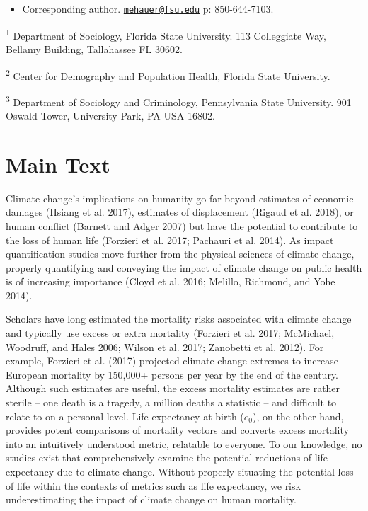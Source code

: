 \documentclass[12pt,]{article}
\providecommand{\tightlist}{%
\setlength{\itemsep}{0pt}\setlength{\parskip}{0pt}}
\begin{document}
\vskip 6.5pt


\noindent \doublespacing \begin{itemize}
\tightlist
\item
  Corresponding author.
  \href{mailto:mehauer@fsu.edu}{\nolinkurl{mehauer@fsu.edu}} p:
  850-644-7103.
\end{itemize}

\textsuperscript{1} Department of Sociology, Florida State University.
113 Colleggiate Way, Bellamy Building, Tallahassee FL 30602.

\textsuperscript{2} Center for Demography and Population Health, Florida
State University.

\textsuperscript{3} Department of Sociology and Criminology,
Pennsylvania State University. 901 Oswald Tower, University Park, PA USA
16802.

\newpage

\hypertarget{main-text}{%
\section{Main Text}\label{main-text}}

Climate change's implications on humanity go far beyond estimates of
economic damages (Hsiang et al. 2017), estimates of displacement (Rigaud
et al. 2018), or human conflict (Barnett and Adger 2007) but have the
potential to contribute to the loss of human life (Forzieri et al. 2017;
Pachauri et al. 2014). As impact quantification studies move further
from the physical sciences of climate change, properly quantifying and
conveying the impact of climate change on public health is of increasing
importance (Cloyd et al. 2016; Melillo, Richmond, and Yohe 2014).

Scholars have long estimated the mortality risks associated with climate
change and typically use excess or extra mortality (Forzieri et al.
2017; McMichael, Woodruff, and Hales 2006; Wilson et al. 2017; Zanobetti
et al. 2012). For example, Forzieri et al. (2017) projected climate
change extremes to increase European mortality by 150,000+ persons per
year by the end of the century. Although such estimates are useful, the
excess mortality estimates are rather sterile -- one death is a tragedy,
a million deaths a statistic -- and difficult to relate to on a personal
level. Life expectancy at birth (\(e_0\)), on the other hand, provides
potent comparisons of mortality vectors and converts excess mortality
into an intuitively understood metric, relatable to everyone. To our
knowledge, no studies exist that comprehensively examine the potential
reductions of life expectancy due to climate change. Without properly
situating the potential loss of life within the contexts of metrics such
as life expectancy, we risk underestimating the impact of climate change
on human mortality.
\end{document}
